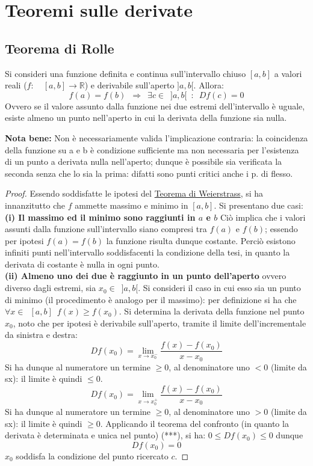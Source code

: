 \documentclass[10pt, oneside]{book}
\theoremstyle{plain}
\begin{document}
\chapter{Teoremi sulle derivate}
\section{Teorema di Rolle}
\begin{ther}
Si consideri una funzione definita e continua sull'intervallo chiuso $[a,b]$ a valori reali ($f : \enspace \enspace [a, b] \rightarrow \mathbb{R}$) e derivabile sull'aperto $]a, b[$. Allora:
\[f(a) = f(b) \enspace \Longrightarrow \enspace \exists c \in \enspace ]a, b[ \enspace : \enspace Df(c) = 0\]
Ovvero se il valore assunto dalla funzione nei due estremi dell'intervallo è uguale, esiste almeno un punto nell'aperto in cui la derivata della funzione sia nulla.
\end{ther}
\textbf{Nota bene:} Non è necessariamente valida l'implicazione contraria: la coincidenza della funzione su a e b è condizione sufficiente ma non necessaria per l'esistenza di un punto a derivata nulla nell'aperto; dunque è possibile sia verificata la seconda senza che lo sia la prima: difatti sono punti critici anche i p. di flesso.
\begin{proof}
Essendo soddisfatte le ipotesi del \hyperlink{weierstrass}{Teorema di Weierstrass}, si ha innanzitutto che $f$ ammette massimo e minimo in $[a, b]$. Si presentano due casi:
\textbf{(i) Il massimo ed il minimo sono raggiunti in $a$ e $b$} Ciò implica che i valori assunti dalla funzione sull'intervallo siano compresi tra $f(a)$ e $f(b)$; essendo per ipotesi $f(a) = f(b)$ la funzione risulta dunque costante. Perciò esistono infiniti punti nell'intervallo soddisfacenti la condizione della tesi, in quanto la derivata di costante è nulla in ogni punto. \\
\textbf{(ii) Almeno uno dei due è raggiunto in un punto dell'aperto} ovvero diverso dagli estremi, sia $x_0 \in \enspace ]a, b[$.
Si consideri il caso in cui esso sia un punto di minimo (il procedimento è analogo per il massimo): per definizione si ha che $\forall x \in \enspace [a, b] \enspace f(x) \geq f(x_0)$. Si determina la derivata della funzione nel punto $x_0$, noto che per ipotesi è derivabile sull'aperto, tramite il limite dell'incrementale da sinistra e destra:
\[D f(x_0) = \lim \limits_{x \rightarrow x_0^-} \frac{f(x) - f(x_0)}{x - x_0}\]
Si ha dunque al numeratore un termine $\geq 0$, al denominatore uno $< 0$ (limite da sx): il limite è quindi $\leq 0$.
\[D f(x_0) = \lim \limits_{x \rightarrow x_0^+} \frac{f(x) - f(x_0)}{x - x_0}\]
Si ha dunque al numeratore un termine $\geq 0$, al denominatore uno $> 0$ (limite da sx): il limite è quindi $\geq 0$.
Applicando il teorema del confronto (in quanto la derivata è determinata e unica nel punto) \hypertarget{confr}{(***)}, si ha: $0 \leq Df(x_0) \leq 0$  dunque \[Df(x_0) = 0\]
$x_0$ soddisfa la condizione del punto ricercato $c$.
\end{proof}
\end{document}
